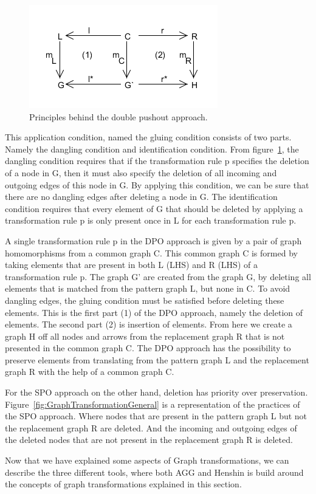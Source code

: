 \begin{figure}[H]
	\centering
	\includegraphics[scale=0.7]{./Figures/DPO.png}
	\caption{Principles behind the double pushout approach.}
	\label{fig:DPO}
\end{figure}

\noindent This application condition, named the gluing condition\cite{Loewe1997}
consists of two parts. Namely the dangling condition and identification
condition. From figure~\ref{fig:DPO}, the dangling condition requires that if
the transformation rule p specifies the deletion of a node in G, then it must also
specify the deletion of all incoming and outgoing edges of this node in G. By
applying this condition, we can be sure that there are no dangling edges after
deleting a node in G. The identification condition requires that every element
of G that should be deleted by applying a transformation rule p is only present
once in L for each transformation rule p. 

A single transformation rule p in the DPO approach is given by a pair of graph
homomorphisms from a common graph C. This common graph C is formed by taking
elements that are present in both L (LHS) and R (LHS) of a transformation rule
p. The graph G' are created from the graph G, by deleting all elements that is
matched from the pattern graph L, but none in C. To avoid dangling edges,
the gluing condition must be satisfied before deleting these elements. This is
the first part (1) of the DPO approach, namely the deletion of elements. The
second part (2) is insertion of elements. From here we create a graph H off all
nodes and arrows from the replacement graph R that is not presented in the
common graph C. The DPO approach has the possibility to preserve elements from
translating from the pattern graph L and the replacement graph R with the help
of a common graph C.

For the SPO approach on the other hand, deletion has priority over preservation.
Figure~\ref{fig:GraphTransformationGeneral} is a representation of the practices
of the SPO approach. Where nodes that are present in the pattern graph L but not
the replacement graph R are deleted. And the incoming and outgoing edges of the
deleted nodes that are not present in the replacement graph R is deleted.

Now that we have explained some aspects of Graph transformations, we can
describe the three different tools, where both AGG and Henshin is build around
the concepts of graph transformations explained in this section. 

